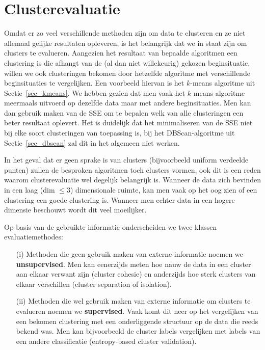 \documentclass[a4paper,12pt]{article}
\theoremstyle{definition}
\begin{document}
\section{Clusterevaluatie}
\label{sec:eval}
Omdat er zo veel verschillende methoden zijn om data te clusteren en ze niet
allemaal gelijke resultaten opleveren, is het belangrijk dat we in staat zijn
om clusters te evalueren. Aangezien het resultaat van bepaalde algoritmen een
clustering is die afhangt van de (al dan niet willekeurig) gekozen beginsituatie, 
willen we ook clusteringen bekomen door hetzelfde algoritme met verschillende
beginsituaties te vergelijken.
Een voorbeeld hiervan is het $k$-means algoritme uit Sectie~\ref{sec_kmeans}.
We hebben gezien dat men vaak het $k$-means algoritme meermaals uitvoerd
op dezelfde data maar met andere beginsituaties. Men kan dan gebruik maken
van de SSE om te bepalen welk van alle clusteringen een beter resultaat oplevert.
Het is duidelijk dat het minimaliseren van de SSE niet bij elke soort clusteringen
van toepassing is, bij het DBScan-algoritme uit Sectie~\ref{sec_dbscan} zal dit in het algemeen niet werken.

In het geval dat er geen sprake is van clusters (bijvoorbeeld uniform verdeelde
punten) zullen de besproken algoritmen toch clusters vormen, ook dit is een reden
waarom clusterevaluatie wel degelijk belangrijk is. Wanneer de data zich bevinden
in een laag (dim $\leq 3$) dimensionale ruimte, kan men vaak op het oog zien of
een clustering een goede clustering is. Wanneer men echter data in een hogere
dimensie beschouwt wordt dit veel moeilijker.

Op basis van de gebruikte informatie onderscheiden we twee klassen evaluatiemethodes:

\begin{itemize}
 \item[(i)] Methoden die geen gebruik maken van externe informatie noemen we
 \textbf{unsupervised}. Men kan eenerzijds meten hoe nauw de data in een cluster
 aan elkaar verwant zijn (cluster cohesie) en anderzijds hoe sterk clusters van elkaar
 verschillen (cluster separation of isolation).
 \item[(ii)] Methoden die wel gebruik maken van externe informatie om clusters te evalueren
 noemen we \textbf{supervised}. Vaak komt dit neer op het vergelijken van een bekomen
 clustering met een onderliggende structuur op de data die reeds bekend was.
 Men kan bijvoorbeeld de cluster labels vergelijken met labels van een andere
 classificatie (entropy-based cluster validation).
\end{itemize}
\end{document}
